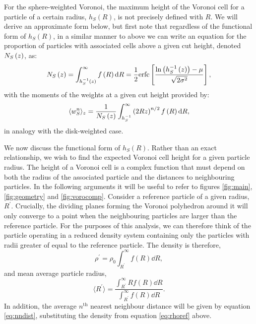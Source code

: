 For the sphere\--weighted Voronoi, the maximum height of the Voronoi cell for a particle of a certain radius, $h_S\left(R\right)$, is not precisely defined with $R$.
We will derive an approximate form below, but first note that regardless of the functional form of $h_S\left(R\right)$, in a similar manner to above we can write an equation for the proportion of particles with associated cells above a given cut height, denoted $N_S\left(z\right)$, as:
\begin{equation}
	\label{eq:nsz}
	N_S\left(z\right) = \int_{h_{S}^{-1}\left(z\right)}^\infty f\left(R\right) \text{d}R = \frac{1}{2}\text{erfc}\left[\frac{\ln{\left(h_{S}^{-1}\left(z\right)\right)}-\mu}{\sqrt{2\sigma^2}}\right],
\end{equation}
with the moments of the weights at a given cut height provided by:
\begin{equation}
	\label{eq:wns}
	\langle w_S^n \rangle_z = \frac{1}{N_S\left(z\right)}\int_{h_{S}^{-1}}^\infty  \left(2Rz\right)^{n/2} f\left(R\right) \text{d} R,
\end{equation}
in analogy with the disk\--weighted case.

We now discuss the functional form of $h_S\left(R\right)$.
Rather than an exact relationship, we wish to find the expected Voronoi cell height for a given particle radius.
The height of a Voronoi cell is a complex function that must depend on both the radius of the associated particle and the distances to neighbouring particles. 
In the following arguments it will be useful to refer to figures \ref{fig:main}, \ref{fig:geometry} and \ref{fig:vorocomp}.
Consider a reference particle of a given radius, $R^\prime$.
Crucially, the dividing planes forming the Voronoi polyhedron around it will only converge to a point when the neighbouring particles are larger than the reference particle.
For the purposes of this analysis, we can therefore think of the particle operating in a reduced density system containing only the particles with radii greater of equal to the reference particle.
The density is therefore,
\begin{equation}
	\label{eq:rhoref}
	\rho^\prime = \rho_0 \int_{R^\prime}^{\infty} f\left(R\right) \dd R,
\end{equation}
and mean average particle radius,
\begin{equation}
	\langle R^\prime \rangle = \frac{\int_{R^\prime}^{\infty} R f\left(R\right) \dd R }{\int_{R^\prime}^{\infty} f\left(R\right) \dd R}.
\end{equation}
In addition, the average $n^{\mathrm{th}}$ nearest neighbour distance will be given by equation \eqref{eq:nndist}, substituting the density from equation \eqref{eq:rhoref} above.

